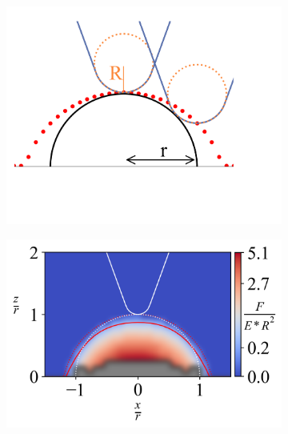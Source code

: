 \begin{figure}[ht]
\centering

    \begin{subfigure}[t]{0.295\textwidth}
        \centering
        \caption{\label{fig: Hemisphere-Setup} }
        \includegraphics[width=1\linewidth]{Figures/Hemisphere-SetUp.png}
    \end{subfigure}
    \hfill
    \begin{subfigure}[t]{0.345\textwidth}
        \centering
        \caption{\label{fig: Hemisphere-ContourPlot-1} }
        \includegraphics[width=1\linewidth]{Figures/Hemisphere-ContourPlot-1.png}
    \end{subfigure}
    \hfill
    \begin{subfigure}[t]{0.345\textwidth}

\end{subfigure}
\end{figure}

